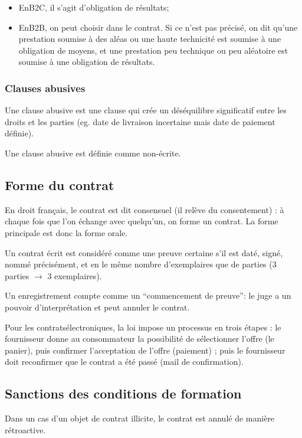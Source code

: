 \documentclass[10pt,a4paper,french]{article}
\begin{document}
\begin{itemize}
\item EnB2C, il s'agit d'obligation de résultats;
\item EnB2B, on peut choisir dans le contrat. Si ce n'est pas précisé, on dit qu'une prestation soumise à des aléas ou une haute technicité est soumise à une obligation de moyens, et une prestation peu technique ou peu aléatoire est soumise à une obligation de résultats.
\end{itemize}

\subsubsection{Clauses abusives}
Une clause abusive est une clause qui crée un déséquilibre significatif entre les droits et les parties (eg. date de livraison incertaine mais date de paiement définie).

Une clause abusive est définie comme non-écrite.

\subsection{Forme du contrat}
En droit français, le contrat est dit consensuel (il relève du consentement) : à chaque fois que l'on échange avec quelqu'un, on forme un contrat. La forme principale est donc la forme orale.

Un contrat écrit est considéré comme une preuve certaine s'il est daté, signé, nommé précisément, et en le même nombre d'exemplaires que de parties (3 parties $\to$ 3 exemplaires).

Un enregistrement compte comme un ``commencement de preuve'': le juge a un pouvoir d'interprétation et peut annuler le contrat.

Pour les contratsélectroniques, la loi impose un processus en trois étapes : le fournisseur donne au consommateur la possibilité de sélectionner l'offre (le panier), puis confirmer l'acceptation de l'offre (paiement) ; puis le fournisseur doit reconfirmer que le contrat a été passé (mail de confirmation).

\subsection{Sanctions des conditions de formation}
Dans un cas d'un objet de contrat illicite, le contrat est annulé de manière rétroactive.
\end{document}
